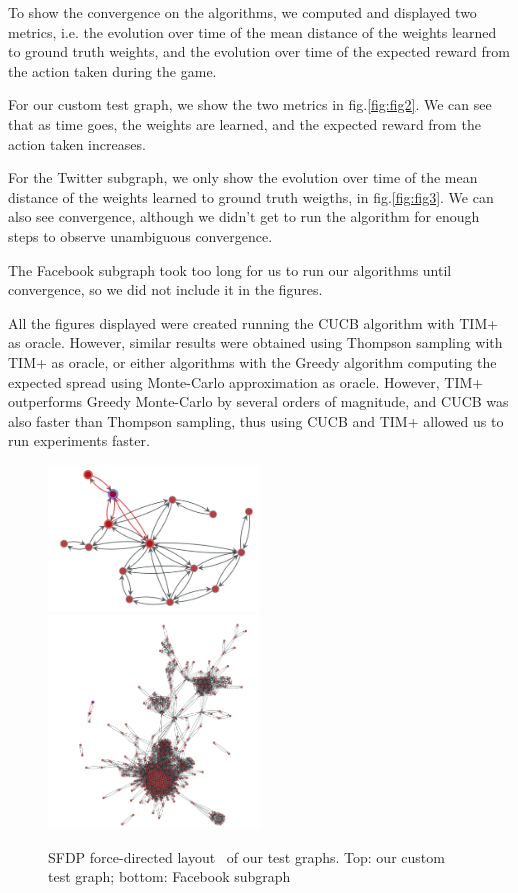 \documentclass[a4paper,12pt]{article}
\begin{document}
To show the convergence on the algorithms, we computed and displayed two metrics, i.e. the evolution over time of the mean distance of the weights learned to ground truth weights, and the evolution over time of the expected reward from the action taken during the game.

For our custom test graph, we show the two metrics in fig.\ref{fig:fig2}. We can see that as time goes, the weights are learned, and the expected reward from the action taken increases.

For the Twitter subgraph, we only show the evolution over time of the mean distance of the weights learned to ground truth weigths, in fig.\ref{fig:fig3}. We can also see convergence, although we didn't get to run the algorithm for enough steps to observe unambiguous convergence.

The Facebook subgraph took too long for us to run our algorithms until convergence, so we did not include it in the figures.

All the figures displayed were created running the CUCB algorithm with TIM+ as oracle. However, similar results were obtained using Thompson sampling with TIM+ as oracle, or either algorithms with the Greedy algorithm computing the expected spread using Monte-Carlo approximation as oracle. However, TIM+ outperforms Greedy Monte-Carlo by several orders of magnitude, and CUCB was also faster than Thompson sampling, thus using CUCB and TIM+ allowed us to run experiments faster.
 
 \begin{figure}
  \centering
    \includegraphics[width=0.5\textwidth]{test_graph.png}
        \includegraphics[width=0.5\textwidth]{facebook.png}
      \caption{SFDP force-directed layout~\cite{hu2005efficient} of our test graphs. Top: our custom test graph; bottom: Facebook subgraph}
        \label{fig:fig1}
\end{figure}
\end{document}
